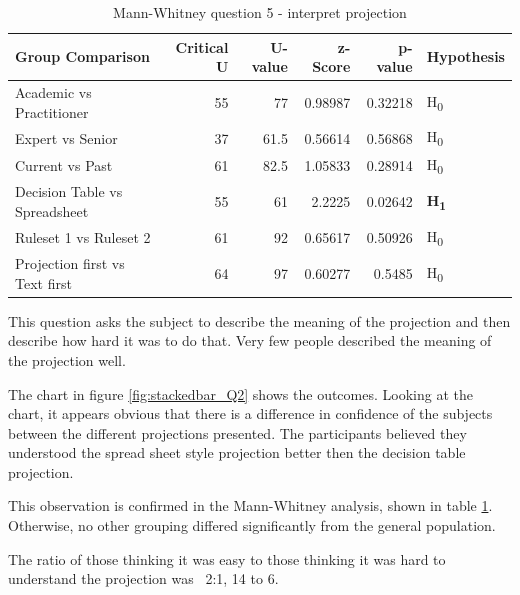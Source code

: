 \begin{table}[H]
    \begin{center}
        \begin{tabular}{ |l ||r |r |r | r|l | } 
            \hline
            Group Comparison                 & Critical U & U-value & z-Score  & p-value & Hypothesis         \\
            \hline
            \hline
            Academic vs Practitioner         & 55        & 77      &  0.98987  & 0.32218 & H\textsubscript{0} \\ 
            \hline
            Expert vs Senior                 & 37        & 61.5    &  0.56614  & 0.56868 & H\textsubscript{0} \\ 
            \hline
            Current vs Past                  & 61        & 82.5    &  1.05833  & 0.28914 & H\textsubscript{0} \\ 
            \hline
            Decision Table vs Spreadsheet    & 55        & 61      &  2.2225   & 0.02642 & \textbf{H\textsubscript{1}}  \\ 
            \hline
            Ruleset 1 vs Ruleset 2           & 61        & 92      &  0.65617  & 0.50926 & H\textsubscript{0} \\ 
            \hline
            Projection first vs Text first   & 64        & 97      &  0.60277  & 0.5485  & H\textsubscript{0} \\ 
            \hline
        \end{tabular}
    \end{center}
    \caption{Mann-Whitney question 5 - interpret projection}
    \label{table:mannwhitneyQ2}
\end{table}

This question asks the subject to describe the meaning of the projection and then describe how hard it was to do that.
Very few people described the meaning of the projection well.

The chart in figure \ref{fig:stackedbar_Q2} shows the outcomes.
Looking at the chart, it appears obvious that there is a difference in confidence of the subjects between the different projections presented.
The participants believed they understood the spread sheet style projection better then the decision table projection.

This observation is confirmed in the Mann-Whitney analysis, shown in table \ref{table:mannwhitneyQ2}.
Otherwise, no other grouping differed significantly from the general population.

The ratio of those thinking it was easy to those thinking it was hard to understand the projection was ~2:1, 14 to 6.

